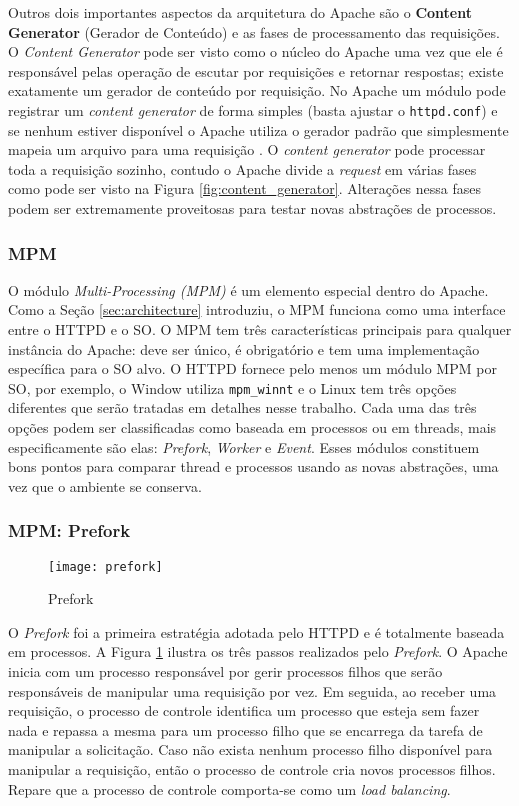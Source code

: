 Outros dois importantes aspectos da arquitetura do Apache são o \textbf{Content
Generator} (Gerador de Conteúdo) e as fases de processamento das requisições. O
\textit{Content Generator} pode ser visto como o núcleo do Apache uma vez que
ele é responsável pelas operação de escutar por requisições e retornar
respostas; existe exatamente um gerador de conteúdo por requisição. No Apache
um módulo pode registrar um \textit{content generator} de forma simples (basta
ajustar o \texttt{httpd.conf}) e se nenhum estiver disponível o Apache utiliza
o gerador padrão que simplesmente mapeia um arquivo para uma requisição
\citep{apache_module_book}. O \textit{content generator} pode processar toda a
requisição sozinho, contudo o Apache divide a \textit{request} em várias fases
como pode ser visto na Figura \ref{fig:content_generator}. Alterações nessa
fases podem ser extremamente proveitosas para testar novas abstrações de
processos.

\subsubsection{MPM}

O módulo \textit{Multi-Processing (MPM)} é um elemento especial dentro do
Apache. Como a Seção \ref{sec:architecture} introduziu, o MPM funciona como uma
interface entre o HTTPD e o SO. O MPM tem três características principais para
qualquer instância do Apache: deve ser único, é obrigatório e tem uma
implementação específica para o SO alvo. O HTTPD fornece pelo menos um módulo
MPM por SO, por exemplo, o Window utiliza \texttt{mpm\_winnt} e o Linux tem
três opções diferentes que serão tratadas em detalhes nesse trabalho. Cada uma
das três opções podem ser classificadas como baseada em processos ou em
threads, mais especificamente são elas: \textit{Prefork}, \textit{Worker} e
\textit{Event}. Esses módulos constituem bons pontos para comparar thread e
processos usando as novas abstrações, uma vez que o ambiente se conserva.

\subsubsection{MPM: Prefork}
\label{sec:prefork}

\begin{figure}[!h]
  \centering
  \texttt{[image: prefork]} 
  \caption{Prefork}
  \label{fig:prefork} 
\end{figure}

O \textit{Prefork} foi a primeira estratégia adotada pelo HTTPD e é totalmente
baseada em processos. A Figura \ref{fig:prefork} ilustra os três passos
realizados pelo \textit{Prefork}. O Apache inicia com um processo responsável
por gerir processos filhos que serão responsáveis de manipular uma requisição
por vez.  Em seguida, ao receber uma requisição, o processo de controle
identifica um processo que esteja sem fazer nada e repassa a mesma para um
processo filho que se encarrega da tarefa de manipular a solicitação. Caso não
exista nenhum processo filho disponível para manipular a requisição, então o
processo de controle cria novos processos filhos. Repare que a processo de
controle comporta-se como um \textit{load balancing}.

